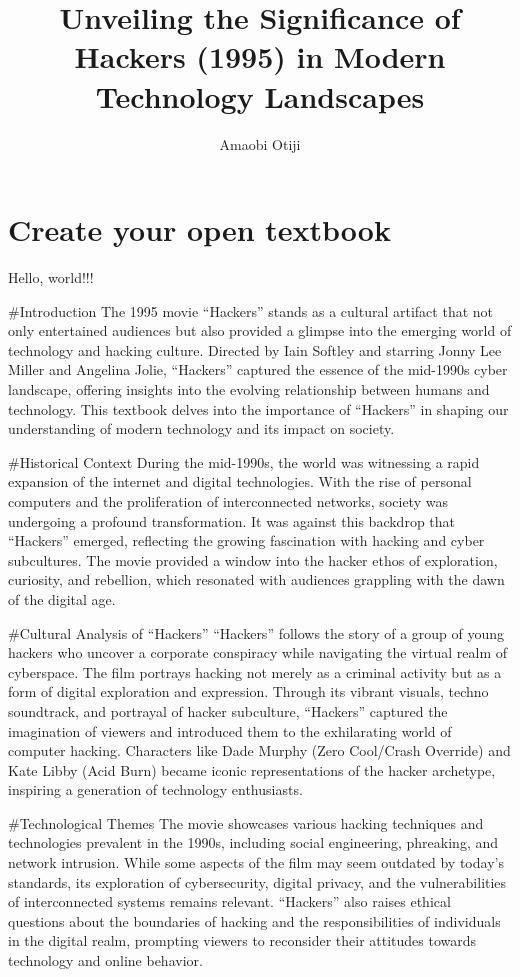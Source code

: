 \documentclass[
  openany]{book}
\title{Unveiling the Significance of Hackers (1995) in Modern Technology Landscapes}
\author{Amaobi Otiji}
\date{}
\begin{document}
\maketitle

{
\setcounter{tocdepth}{1}
\tableofcontents
}
\hypertarget{create-your-open-textbook}{%
\chapter{Create your open textbook}\label{create-your-open-textbook}}

Hello, world!!!

\#Introduction
The 1995 movie ``Hackers'' stands as a cultural artifact that not only entertained audiences but also provided a glimpse into the emerging world of technology and hacking culture. Directed by Iain Softley and starring Jonny Lee Miller and Angelina Jolie, ``Hackers'' captured the essence of the mid-1990s cyber landscape, offering insights into the evolving relationship between humans and technology. This textbook delves into the importance of ``Hackers'' in shaping our understanding of modern technology and its impact on society.

\#Historical Context
During the mid-1990s, the world was witnessing a rapid expansion of the internet and digital technologies. With the rise of personal computers and the proliferation of interconnected networks, society was undergoing a profound transformation. It was against this backdrop that ``Hackers'' emerged, reflecting the growing fascination with hacking and cyber subcultures. The movie provided a window into the hacker ethos of exploration, curiosity, and rebellion, which resonated with audiences grappling with the dawn of the digital age.

\#Cultural Analysis of ``Hackers''
``Hackers'' follows the story of a group of young hackers who uncover a corporate conspiracy while navigating the virtual realm of cyberspace. The film portrays hacking not merely as a criminal activity but as a form of digital exploration and expression. Through its vibrant visuals, techno soundtrack, and portrayal of hacker subculture, ``Hackers'' captured the imagination of viewers and introduced them to the exhilarating world of computer hacking. Characters like Dade Murphy (Zero Cool/Crash Override) and Kate Libby (Acid Burn) became iconic representations of the hacker archetype, inspiring a generation of technology enthusiasts.

\#Technological Themes
The movie showcases various hacking techniques and technologies prevalent in the 1990s, including social engineering, phreaking, and network intrusion. While some aspects of the film may seem outdated by today's standards, its exploration of cybersecurity, digital privacy, and the vulnerabilities of interconnected systems remains relevant. ``Hackers'' also raises ethical questions about the boundaries of hacking and the responsibilities of individuals in the digital realm, prompting viewers to reconsider their attitudes towards technology and online behavior.
\end{document}
